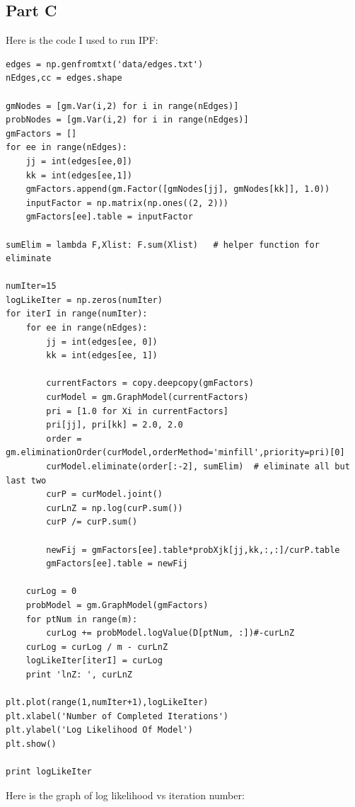 \documentclass[twoside,11pt]{article}
\theoremstyle{definition}
\begin{document}
\subsection*{Part C}
Here is the code I used to run IPF:
\begin{lstlisting}
edges = np.genfromtxt('data/edges.txt')
nEdges,cc = edges.shape

gmNodes = [gm.Var(i,2) for i in range(nEdges)]
probNodes = [gm.Var(i,2) for i in range(nEdges)]
gmFactors = []
for ee in range(nEdges):
    jj = int(edges[ee,0])
    kk = int(edges[ee,1])
    gmFactors.append(gm.Factor([gmNodes[jj], gmNodes[kk]], 1.0))
    inputFactor = np.matrix(np.ones((2, 2)))
    gmFactors[ee].table = inputFactor

sumElim = lambda F,Xlist: F.sum(Xlist)   # helper function for eliminate

numIter=15
logLikeIter = np.zeros(numIter)
for iterI in range(numIter):
    for ee in range(nEdges):
        jj = int(edges[ee, 0])
        kk = int(edges[ee, 1])

        currentFactors = copy.deepcopy(gmFactors)
        curModel = gm.GraphModel(currentFactors)
        pri = [1.0 for Xi in currentFactors]
        pri[jj], pri[kk] = 2.0, 2.0
        order = gm.eliminationOrder(curModel,orderMethod='minfill',priority=pri)[0]
        curModel.eliminate(order[:-2], sumElim)  # eliminate all but last two
        curP = curModel.joint()
        curLnZ = np.log(curP.sum())
        curP /= curP.sum()

        newFij = gmFactors[ee].table*probXjk[jj,kk,:,:]/curP.table
        gmFactors[ee].table = newFij

    curLog = 0
    probModel = gm.GraphModel(gmFactors)
    for ptNum in range(m):
        curLog += probModel.logValue(D[ptNum, :])#-curLnZ
    curLog = curLog / m - curLnZ
    logLikeIter[iterI] = curLog
    print 'lnZ: ', curLnZ

plt.plot(range(1,numIter+1),logLikeIter)
plt.xlabel('Number of Completed Iterations')
plt.ylabel('Log Likelihood Of Model')
plt.show()

print logLikeIter
\end{lstlisting}
\newpage

Here is the graph of log likelihood vs iteration number:
\end{document}
